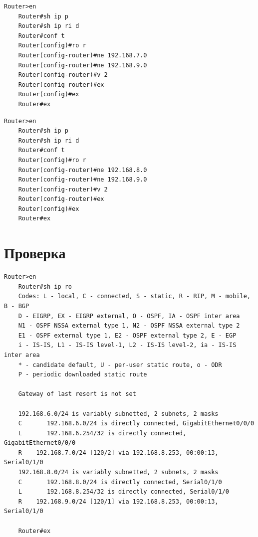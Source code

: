\documentclass[a4paper,oneside,12pt]{extreport}
\begin{document}
\begin{lstlisting}[gobble=8, caption=Настройка маршрутизатора Router1]
	Router>en
	Router#sh ip p
	Router#sh ip ri d
	Router#conf t
	Router(config)#ro r
	Router(config-router)#ne 192.168.7.0
	Router(config-router)#ne 192.168.9.0
	Router(config-router)#v 2
	Router(config-router)#ex
	Router(config)#ex
	Router#ex
\end{lstlisting}

\begin{lstlisting}[gobble=8, caption=Настройка маршрутизатора Router2]
	Router>en
	Router#sh ip p
	Router#sh ip ri d
	Router#conf t
	Router(config)#ro r
	Router(config-router)#ne 192.168.8.0
	Router(config-router)#ne 192.168.9.0
	Router(config-router)#v 2
	Router(config-router)#ex
	Router(config)#ex
	Router#ex
\end{lstlisting}

\section{Проверка}

\begin{lstlisting}[gobble=8, caption=\code{Router0\# show ip route}]
	Router>en
	Router#sh ip ro
	Codes: L - local, C - connected, S - static, R - RIP, M - mobile, B - BGP
	D - EIGRP, EX - EIGRP external, O - OSPF, IA - OSPF inter area
	N1 - OSPF NSSA external type 1, N2 - OSPF NSSA external type 2
	E1 - OSPF external type 1, E2 - OSPF external type 2, E - EGP
	i - IS-IS, L1 - IS-IS level-1, L2 - IS-IS level-2, ia - IS-IS inter area
	* - candidate default, U - per-user static route, o - ODR
	P - periodic downloaded static route

	Gateway of last resort is not set

	192.168.6.0/24 is variably subnetted, 2 subnets, 2 masks
	C       192.168.6.0/24 is directly connected, GigabitEthernet0/0/0
	L       192.168.6.254/32 is directly connected, GigabitEthernet0/0/0
	R    192.168.7.0/24 [120/2] via 192.168.8.253, 00:00:13, Serial0/1/0
	192.168.8.0/24 is variably subnetted, 2 subnets, 2 masks
	C       192.168.8.0/24 is directly connected, Serial0/1/0
	L       192.168.8.254/32 is directly connected, Serial0/1/0
	R    192.168.9.0/24 [120/1] via 192.168.8.253, 00:00:13, Serial0/1/0

	Router#ex
\end{lstlisting}
\end{document}
